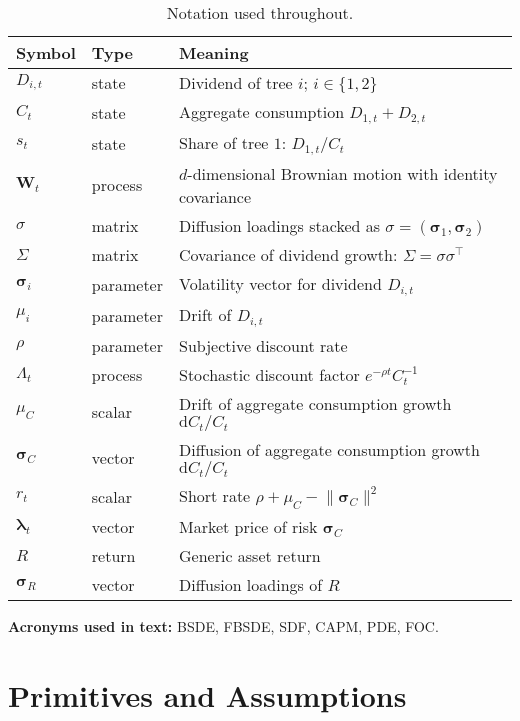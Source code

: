 ﻿\documentclass[11pt,letterpaper,oneside]{article}
\numberwithin{equation}{section}
\newcommand{\ac}[1]{{\mdseries\textsc{#1}}}
\newcommand{\printacronyms}{}
\newcommand{\1}{\mathbf{1}}
\newcommand{\diff}{\mathrm{d}}
\begin{document}
\begin{table}[ht]
\centering
\small
\begin{tabular}{@{} l l p{}}
\toprule
\textbf{Symbol} & \textbf{Type} & \textbf{Meaning} \\
\midrule
$D_{i,t}$ & state & Dividend of tree $i$; $i\in\{1,2\}$ \\
$C_t$ & state & Aggregate consumption $D_{1,t}+D_{2,t}$ \\
$s_t$ & state & Share of tree $1$: $D_{1,t}/C_t$ \\
$\bm{W}_t$ & process & $d$-dimensional Brownian motion with identity covariance \\
$\sigma$ & matrix & Diffusion loadings stacked as $\sigma=(\bm{\sigma}_1,\bm{\sigma}_2)$ \\
$\Sigma$ & matrix & Covariance of dividend growth: $\Sigma=\sigma\sigma^{\top}$ \\
$\bm{\sigma}_i$ & parameter & Volatility vector for dividend $D_{i,t}$ \\
$\mu_i$ & parameter & Drift of $D_{i,t}$ \\
$\rho$ & parameter & Subjective discount rate \\
$\Lambda_t$ & process & Stochastic discount factor $e^{-\rho t} C_t^{-1}$ \\
$\mu_C$ & scalar & Drift of aggregate consumption growth $\diff C_t/C_t$ \\
$\bm{\sigma}_C$ & vector & Diffusion of aggregate consumption growth $\diff C_t/C_t$ \\
$r_t$ & scalar & Short rate $\rho+\mu_C-\lVert\bm{\sigma}_C\rVert^2$ \\
$\bm{\lambda}_t$ & vector & Market price of risk $\bm{\sigma}_C$ \\
$R$ & return & Generic asset return \\
$\bm{\sigma}_R$ & vector & Diffusion loadings of $R$ \\
\bottomrule
\end{tabular}
\caption{Notation used throughout.}
\end{table}

\medskip
\noindent\textbf{Acronyms used in text:} \ac{BSDE}, \ac{FBSDE}, \ac{SDF}, \ac{CAPM}, \ac{PDE}, \ac{FOC}.
\medskip

\printacronyms


\newpage
\clearpage
\section{Primitives and Assumptions}
\end{document}
